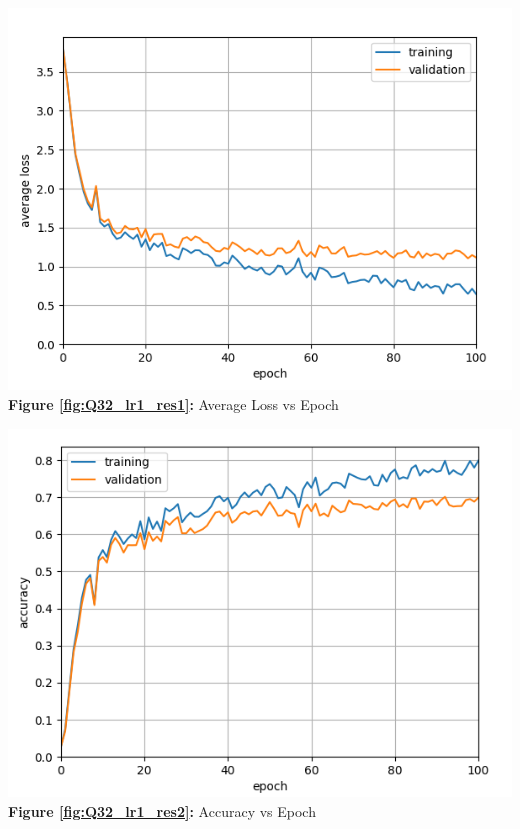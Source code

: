 \documentclass{article}
\begin{document}
	\begin{minipage}{0.48\linewidth}
	\centering
	\includegraphics[width=\linewidth]{./Q32_lr1_res1.png}
	\textbf{Figure \ref{fig:Q32_lr1_res1}:} Average Loss vs Epoch %
	\label{fig:Q32_lr1_res1}         %
	\end{minipage}
\hfill
	\begin{minipage}{0.48\linewidth}
	\centering
	\includegraphics[width=\linewidth]{./Q32_lr1_res2.png}
	\textbf{Figure \ref{fig:Q32_lr1_res2}:} Accuracy vs Epoch  %
	\label{fig:Q32_lr1_res2}         %
	\end{minipage}	
	\newline
	\newline
	
\end{document}
